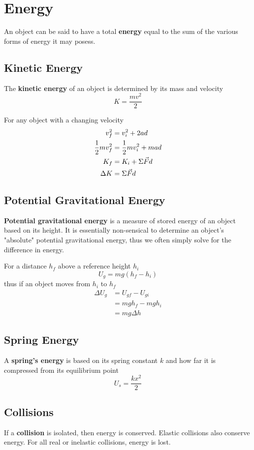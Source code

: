 \documentclass[12pt]{article}
\begin{document}
\section*{Energy}
An object can be said to have a total {\bf energy} equal to the sum of the various forms of energy it may posess.

\subsection*{Kinetic Energy}
The {\bf kinetic energy} of an object is determined by its mass and velocity \[ K = \frac{mv^2}{2} \]

For any object with a changing velocity
\begin{align*}
v_f^2 &= v_i^2 + 2ad\\
\frac{1}{2} mv_f^2 &= \frac{1}{2} mv_i^2 + mad\\
K_f &= K_i + \Sigma\vec{F}d\\
\Delta K &= \Sigma\vec{F}d
\end{align*}

\subsection*{Potential Gravitational Energy}
{\bf Potential gravitational energy} is a measure of stored energy of an object based on its height. It is essentially non-sensical to determine an object's "absolute" potential gravitational energy, thus we often simply solve for the difference in energy.

For a distance $h_f$ above a reference height $h_i$ \[ U_g = mg(h_f-h_i) \] thus if an object moves from $h_i$ to $h_f$
\begin{align*}
\Delta U_g &= U_{gf} - U_{gi}\\
&= mgh_f - mgh_i\\
&= mg\Delta h
\end{align*}

\subsection*{Spring Energy}
A {\bf spring's energy} is based on its spring constant $k$ and how far it is compressed from its equilibrium point \[ U_s = \frac{kx^2}{2} \]

\subsection*{Collisions}
If a {\bf collision} is isolated, then energy is conserved. Elastic collisions also conserve energy. For all real or inelastic collisions, energy is lost.
\end{document}
